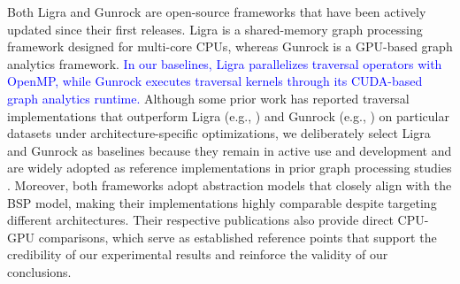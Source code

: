 Both Ligra and Gunrock are open-source frameworks that have been actively updated since their first releases.
Ligra is a shared-memory graph processing framework designed for multi-core CPUs, whereas Gunrock is a GPU-based graph analytics framework.
\textcolor{blue}{In our baselines, Ligra parallelizes traversal operators with OpenMP, while Gunrock executes traversal kernels through its CUDA-based graph analytics runtime.}
Although some prior work has reported traversal implementations that outperform Ligra (e.g., \cite{zhang2018graphit}) and Gunrock (e.g., \cite{wang2019sep}) on particular datasets under architecture-specific optimizations, we deliberately select Ligra and Gunrock as baselines because they remain in active use and development and are widely adopted as reference implementations in prior graph processing studies \cite{zhang2018graphit, nguyen2013lightweight, zhu2016gemini, wang2016gunrock, wang2019sep, brahmakshatriya2021compiling}.
Moreover, both frameworks adopt abstraction models that closely align with the BSP model, making their implementations highly comparable despite targeting different architectures.
Their respective publications also provide direct CPU-GPU comparisons, which serve as established reference points that support the credibility of our experimental results and reinforce the validity of our conclusions.


